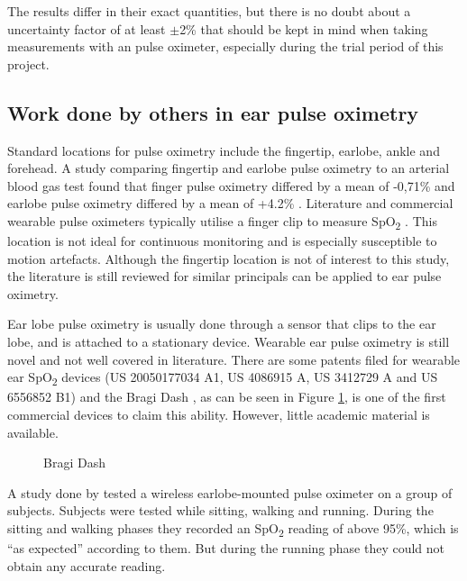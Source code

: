 The results differ in their exact quantities, but there is no doubt about a uncertainty factor of at least $\pm$2\% that should be kept in mind when taking measurements with an pulse oximeter, especially during the trial period of this project.


\subsection{Work done by others in ear pulse oximetry}
Standard locations for pulse oximetry include the fingertip, earlobe, ankle and forehead. A study comparing fingertip and earlobe pulse oximetry to an arterial blood gas test found that finger pulse oximetry differed by a mean of -0,71\% and earlobe pulse oximetry differed by a mean of +4.2\% \citep{olive2016comparison}. Literature and commercial wearable pulse oximeters typically utilise a finger clip to measure SpO\textsubscript{2} \citep{watthanawisuth2010wireless, pujary2003photodetector, huang2014novel, khalifa2014development}. This location is not ideal for continuous monitoring and is especially susceptible to motion artefacts. Although the fingertip location is not of interest to this study, the literature is still reviewed for similar principals can be applied to ear pulse oximetry.

\medskip
Ear lobe pulse oximetry is usually done through a sensor that clips to the ear lobe, and is attached to a stationary device. Wearable ear pulse oximetry is still novel and not well covered in literature. There are some patents filed for wearable ear SpO\textsubscript{2} devices (US 20050177034 A1, US 4086915 A, US 3412729 A and US 6556852 B1) and the Bragi Dash \citep{BragiDash}, as can be seen in Figure \ref{fig:BragiDash}, is one of the first commercial devices to claim this ability. However, little academic material is available.

\begin{figure}[H]
\centering
\graphicspath{{figs/}}

\caption{Bragi Dash}
\label{fig:BragiDash}
\end{figure}

\medskip
A study done by \citep{aziz2006pervasive} tested a wireless earlobe-mounted pulse oximeter on a group of subjects. Subjects were tested while sitting, walking and running. During the sitting and walking phases they recorded an SpO\textsubscript{2} reading of above 95\%, which is \enquote{as expected} according to them. But during the running phase they could not obtain any accurate reading.